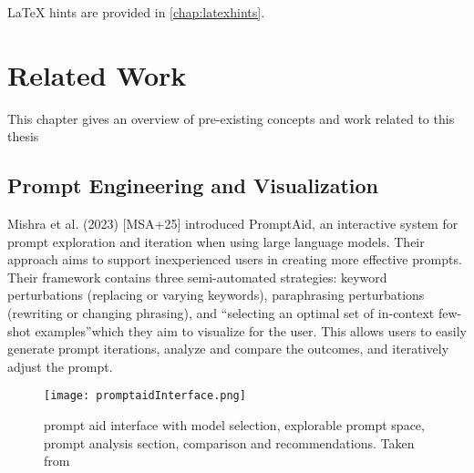 \documentclass[
  a4paper,  %
  twoside,  %
  bibliography=totoc,
  headsepline,
  cleardoublepage=empty,
  parskip=half,
  draft=false
]{scrbook}
\begin{document}
LaTeX hints are provided in \cref{chap:latexhints}.


\chapter{Related Work}
This chapter gives an overview of pre-existing concepts and work related to this thesis 


\section{Prompt Engineering and Visualization}
Mishra et al. (2023) [MSA+25] introduced PromptAid, an interactive system for prompt exploration and iteration when using large language models. Their approach aims to support inexperienced users in creating more effective prompts. Their framework contains three semi-automated strategies: keyword perturbations (replacing or varying keywords), paraphrasing perturbations (rewriting or changing phrasing), and \enquote {selecting an optimal set of in-context few-shot examples}which they aim to visualize for the user. This allows users to easily generate prompt iterations, analyze and compare the outcomes, and iteratively adjust the prompt. \\
  \begin{figure}[H]
	\centering
	\texttt{[image: promptaidInterface.png]}
	\caption{prompt aid interface with model selection, explorable prompt space, prompt analysis section, comparison and recommendations. Taken from \cite{mishra2025promptaidpromptexplorationperturbation}}
	\label{fig:promptAid}
\end{figure}
\end{document}
